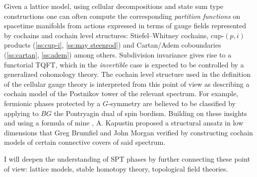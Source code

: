 Given a lattice model, using cellular decompositions and state sum type constructions one can often compute the corresponding \textit{partition functions} on spacetime manifolds from actions expressed in terms of gauge fields represented by cochains and cochain level structures: Stiefel--Whitney cochains, cup-$(p, i)$ products (\cref{ss:cup-i}, \cref{ss:may steenrod}) and Cartan/Adem coboundaries (\cref{ss:cartan}, \cref{ss:adem}) among others.
Subdivision invariance gives rise to a functorial TQFT, which in the \textit{invertible} case is expected to be controlled by a generalized cohomology theory.
The cochain level structure used in the definition of the cellular gauge theory is interpreted from this point of view as describing a cochain model of the Postnikov tower of the relevant spectrum.
For example, fermionic phases protected by a $G$-symmetry are believed to be classified by applying to $BG$ the Pontryagin dual of spin bordism.
Building on these insights and using a formula of mine \cite{medina2020cartan}, A. Kapustin proposed a structural ansatz in low dimensions that Greg Brumfiel and John Morgan verified by constructing cochain models of certain connective covers of said spectrum.

I will deepen the understanding of SPT phases by further connecting these point of view: lattice models, stable homotopy theory, topological field theories.
